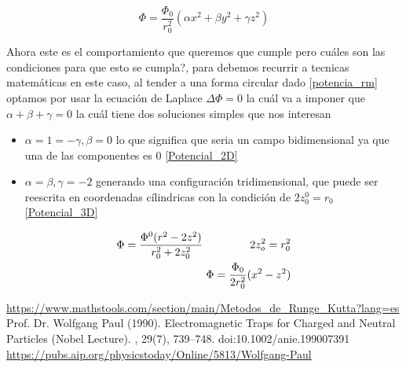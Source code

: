 \documentclass{article}
\begin{document}
\begin{equation}
    \Phi=\frac{\Phi_0}{r_0^2}(\alpha x^2+\beta y^2+\gamma z^2)
\end{equation}

Ahora este es el comportamiento que queremos que cumple pero cuáles son las condiciones para 
que esto se cumpla?, para debemos recurrir a tecnicas matemáticas en este caso, al tender a una
forma circular dado \eqref{potencia_rm} optamos por usar la ecuación de Laplace $\Delta \Phi = 0$
la cuál va a imponer que $\alpha + \beta + \gamma=0$ la cuál tiene dos soluciones simples que nos interesan
\begin{itemize}
    \item $\alpha=1=-\gamma, \beta=0$ lo que significa que seria un campo bidimensional ya que una de las componentes es $0$ \eqref{Potencial_2D}
    \item $\alpha=\beta, \gamma=-2$ generando una configuración tridimensional, que puede ser reescrita en coordenadas cílindricas con la condición de $2z_0^0=r_0$ \eqref{Potencial_3D}
\end{itemize}

\begin{align}
    \Phi = \frac{\Phi^0(r^2-2z^2)}{r_0^2+2z_0^2} \hspace{1.5cm} 2z_o^2=r_0^2 \label{Potencial_3D}\\
    \Phi = \frac{\Phi_0}{2r_0^2}(x^2-z^2) \label{Potencial_2D}
\end{align}


\begin{thebibliography}{5}
    \url{https://www.mathstools.com/section/main/Metodos_de_Runge_Kutta?lang=es}
    Prof. Dr. Wolfgang Paul (1990). Electromagnetic Traps for Charged and Neutral Particles (Nobel Lecture). , 29(7), 739–748. doi:10.1002/anie.199007391 
    \url{https://pubs.aip.org/physicstoday/Online/5813/Wolfgang-Paul}
\end{thebibliography}
\end{document}
